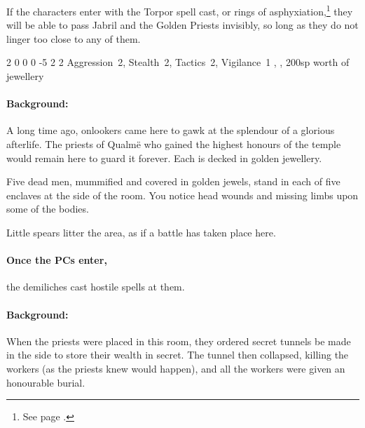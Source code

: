 \begin{multicols}{2}
If the characters enter with the Torpor spell cast, or rings of asphyxiation,\footnote{See page \pageref{ring_asphyxiation}.} they will be able to pass Jabril and the Golden Priests invisibly, so long as they do not linger too close to any of them.


  {2}%
  {0}%
  {{0}%
  {0}%
  {-5}}%
  {2}%
  {2}%
  {Aggression~2, Stealth~2, Tactics~2, Vigilance~1}%
  {\shortsword, \completeplate, 200sp worth of jewellery}%
  {}


\paragraph{Background:}
A long time ago, onlookers came here to gawk at the splendour of a glorious afterlife.
The priests of Qualm\"{e} who gained the highest honours of the temple would remain here to guard it forever.
Each is decked in golden jewellery.

\begin{boxtext}

  Five dead men, mummified and covered in golden jewels, stand in each of five enclaves at the side of the room.
  You notice head wounds and missing limbs upon some of the bodies.

  Little spears litter the area, as if a battle has taken place here.

\end{boxtext}


\paragraph{Once the PCs enter,}
the demiliches cast hostile spells at them.


\paragraph{Background:}
When the priests were placed in this room, they ordered secret tunnels be made in the side to store their wealth in secret.
The tunnel then collapsed, killing the workers (as the priests knew would happen), and all the workers were given an honourable burial.


\end{multicols}

